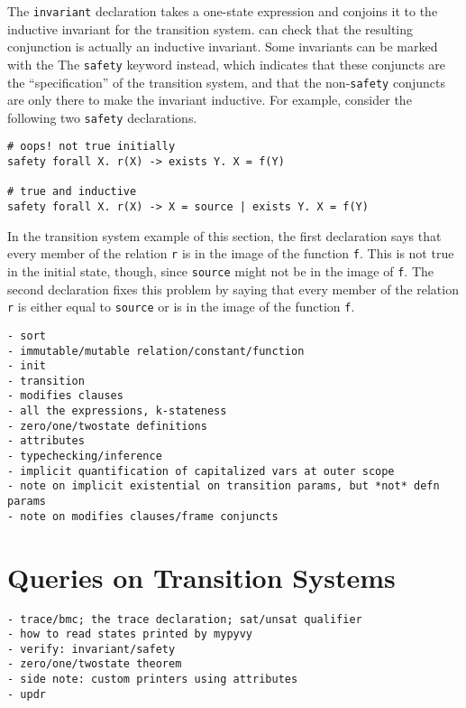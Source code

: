 The \lstinline[language=mypyvy]{invariant} declaration takes a one-state expression
  and conjoins it to the inductive invariant for the transition system.
\mypyvy can check that the resulting conjunction is actually an inductive invariant.
Some invariants can be marked with the The \lstinline[language=mypyvy]{safety} keyword instead,
  which indicates that these conjuncts are the ``specification'' of the transition system,
  and that the non-\lstinline[language=mypyvy]{safety} conjuncts are only there
  to make the invariant inductive.
For example, consider the following two \lstinline[language=mypyvy]{safety} declarations.
\begin{lstlisting}[language=mypyvy, xleftmargin=.2\textwidth, xrightmargin=.2\textwidth]
# oops! not true initially
safety forall X. r(X) -> exists Y. X = f(Y)

# true and inductive
safety forall X. r(X) -> X = source | exists Y. X = f(Y)
\end{lstlisting}
In the transition system example of this section,
  the first declaration says that every member of the relation \lstinline[language=mypyvy]{r}
  is in the image of the function \lstinline[language=mypyvy]{f}.
This is not true in the initial state, though,
  since \lstinline[language=mypyvy]{source} might not be in the image of \lstinline[language=mypyvy]{f}.
The second declaration fixes this problem by saying that
  every member of the relation \lstinline[language=mypyvy]{r}
  is either equal to \lstinline[language=mypyvy]{source}
  or is in the image of the function \lstinline[language=mypyvy]{f}.

\begin{verbatim}
- sort
- immutable/mutable relation/constant/function
- init
- transition
- modifies clauses
- all the expressions, k-stateness
- zero/one/twostate definitions
- attributes
- typechecking/inference
- implicit quantification of capitalized vars at outer scope
- note on implicit existential on transition params, but *not* defn params
- note on modifies clauses/frame conjuncts
\end{verbatim}

\section{Queries on Transition Systems}\label{sec:mypyvy-queries}

\begin{verbatim}
- trace/bmc; the trace declaration; sat/unsat qualifier
- how to read states printed by mypyvy
- verify: invariant/safety
- zero/one/twostate theorem
- side note: custom printers using attributes
- updr
\end{verbatim}


